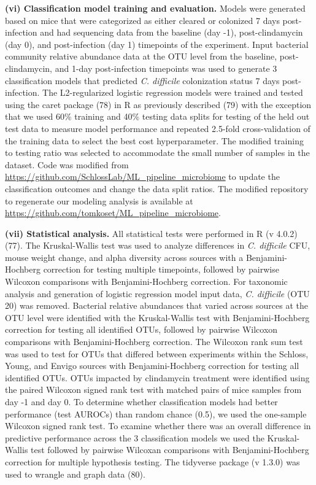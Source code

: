 \documentclass[
  11pt,
]{article}
\begin{document}
\textbf{(vi) Classification model training and evaluation.} Models were
generated based on mice that were categorized as either cleared or
colonized 7 days post-infection and had sequencing data from the
baseline (day -1), post-clindamycin (day 0), and post-infection (day 1)
timepoints of the experiment. Input bacterial community relative
abundance data at the OTU level from the baseline, post-clindamycin, and
1-day post-infection timepoints was used to generate 3 classification
models that predicted \emph{C. difficile} colonization status 7 days
post-infection. The L2-regularized logistic regression models were
trained and tested using the caret package (78) in R as previously
described (79) with the exception that we used 60\% training and 40\%
testing data splits for testing of the held out test data to measure
model performance and repeated 2.5-fold cross-validation of the training
data to select the best cost hyperparameter. The modified training to
testing ratio was selected to accommodate the small number of samples in
the dataset. Code was modified from
\url{https://github.com/SchlossLab/ML_pipeline_microbiome} to update the
classification outcomes and change the data split ratios. The modified
repository to regenerate our modeling analysis is available at
\url{https://github.com/tomkoset/ML_pipeline_microbiome}.

\textbf{(vii) Statistical analysis.} All statistical tests were
performed in R (v 4.0.2) (77). The Kruskal-Wallis test was used to
analyze differences in \emph{C. difficile} CFU, mouse weight change, and
alpha diversity across sources with a Benjamini-Hochberg correction for
testing multiple timepoints, followed by pairwise Wilcoxon comparisons
with Benjamini-Hochberg correction. For taxonomic analysis and
generation of logistic regression model input data, \emph{C. difficile}
(OTU 20) was removed. Bacterial relative abundances that varied across
sources at the OTU level were identified with the Kruskal-Wallis test
with Benjamini-Hochberg correction for testing all identified OTUs,
followed by pairwise Wilcoxon comparisons with Benjamini-Hochberg
correction. The Wilcoxon rank sum test was used to test for OTUs that
differed between experiments within the Schloss, Young, and Envigo
sources with Benjamini-Hochberg correction for testing all identified
OTUs. OTUs impacted by clindamycin treatment were identified using the
paired Wilcoxon signed rank test with matched pairs of mice samples from
day -1 and day 0. To determine whether classification models had better
performance (test AUROCs) than random chance (0.5), we used the
one-sample Wilcoxon signed rank test. To examine whether there was an
overall difference in predictive performance across the 3 classification
models we used the Kruskal-Wallis test followed by pairwise Wilcoxan
comparisons with Benjamini-Hochberg correction for multiple hypothesis
testing. The tidyverse package (v 1.3.0) was used to wrangle and graph
data (80).
\end{document}

